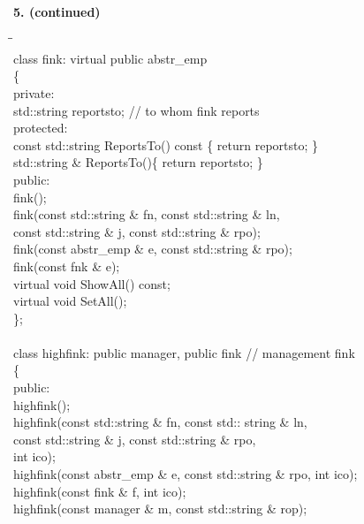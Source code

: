 \documentclass[10 pt]{amsart}
\newlength{\cwidth}
\newenvironment{cpartContinued}[2][\cwidth]
	{%
		\\ %
		\textbf{#2. (continued)}%
		\\
		\phantom{#2. }
		\begin{minipage}[t]{#1}%
		\setlength{\parindent}{0pt}%
		\setlength{\parskip}{2ex}%
	}
	{%
		\end{minipage}%
	}
\begin{document}
	\begin{cpartContinued}{5}
		{\ttfamily
			\begin{tabbing}
				\phantom{\qquad}\=\hspace{10ex}\=\hspace{8ex}\hspace{8ex}\= \\
				class fink: virtual public abstr\_emp \\
				\{
				\+ \\
				\< private: \\
					std::string reportsto; \hspace{8ex} // to whom fink reports \\
				\< protected: \\
					const std::string ReportsTo() const \{ return reportsto; \} \\
					std::string \& ReportsTo()\{ return reportsto; \} \\
				\< public: \\
					fink(); \\
					fink(const std::string \& fn, const std::string \& ln, \\
					\phantom{fink(}const std::string \& j, const std::string
						\& rpo); \\
					fink(const abstr\_emp \& e, const std::string \& rpo); \\
					fink(const fnk \& e); \\
					virtual void ShowAll() const; \\
					virtual void SetAll(); \\
				\< \}; \\
				\- \\
				class highfink: public manager, public fink // management fink \\
				\{
				\+ \\
				\< public: \\
					highfink(); \\
					highfink(const std::string \& fn, const std:: string \& 
						ln, \\
					\phantom{highfink(}const std::string \& j, const
						std::string \& rpo, \\
					\phantom{highfink(}int ico); \\
					highfink(const abstr\_emp \& e, const std::string \& rpo, 
						int ico); \\
					highfink(const fink \& f, int ico); \\
					highfink(const manager \& m, const std::string \& rop); \\

\end{tabbing}}
\end{cpartContinued}
\end{document}
